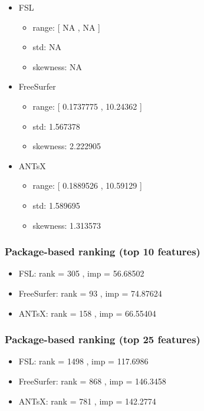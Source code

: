\documentclass[
  10pt,
]{article}
\begin{document}
\begin{itemize}
\item
  FSL

  \begin{itemize}
  \item
    range: {[} NA , NA {]}
  \item
    std: NA
  \item
    skewness: NA
  \end{itemize}
\item
  FreeSurfer

  \begin{itemize}
  \item
    range: {[} 0.1737775 , 10.24362 {]}
  \item
    std: 1.567378
  \item
    skewness: 2.222905
  \end{itemize}
\item
  ANTsX

  \begin{itemize}
  \item
    range: {[} 0.1889526 , 10.59129 {]}
  \item
    std: 1.589695
  \item
    skewness: 1.313573
  \end{itemize}
\end{itemize}

\hypertarget{package-based-ranking-top-10-features-6}{%
\subsubsection{Package-based ranking (top 10
features)}\label{package-based-ranking-top-10-features-6}}

\begin{itemize}
\item
  FSL: rank = 305 , imp = 56.68502
\item
  FreeSurfer: rank = 93 , imp = 74.87624
\item
  ANTsX: rank = 158 , imp = 66.55404
\end{itemize}

\hypertarget{package-based-ranking-top-25-features-6}{%
\subsubsection{Package-based ranking (top 25
features)}\label{package-based-ranking-top-25-features-6}}

\begin{itemize}
\item
  FSL: rank = 1498 , imp = 117.6986
\item
  FreeSurfer: rank = 868 , imp = 146.3458
\item
  ANTsX: rank = 781 , imp = 142.2774
\end{itemize}
\end{document}
